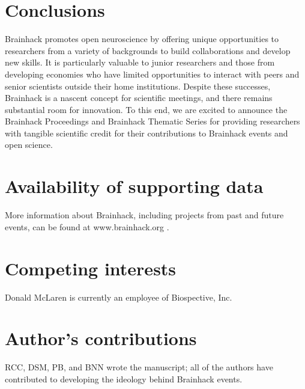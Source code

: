 \documentclass[11pt]{bmc_article_s50}
\begin{document}
\section*{Conclusions}

Brainhack promotes open neuroscience by offering unique opportunities to researchers from a variety of backgrounds to build collaborations and develop new skills. It is particularly valuable to junior researchers and those from developing economies who have limited opportunities to interact with peers and senior scientists outside their home institutions. Despite these successes, Brainhack is a nascent concept for scientific meetings, and there remains substantial room for innovation. To this end, we are excited to announce the Brainhack Proceedings and Brainhack Thematic Series for providing researchers with tangible scientific credit for their contributions to Brainhack events and open science.


\section*{Availability of supporting data}
More information about Brainhack, including projects from past and future events, can be found at www.brainhack.org \cite{brainhackorg}.

\section*{Competing interests}
Donald McLaren is currently an employee of Biospective, Inc.

\section*{Author's contributions}
RCC, DSM, PB, and BNN wrote the manuscript; %
 all of the authors have contributed to developing the ideology behind Brainhack events.
\end{document}
